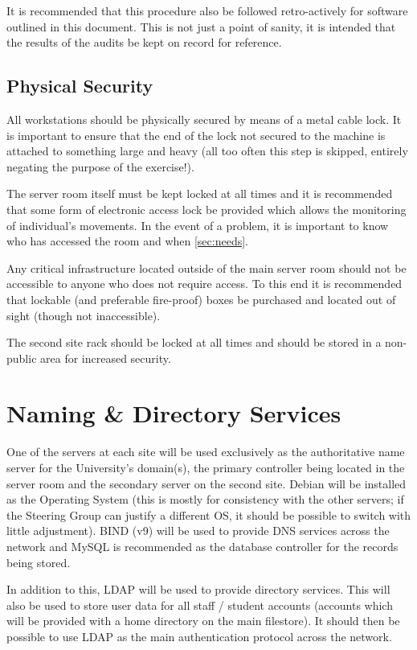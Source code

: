 \documentclass[a4paper, twoside]{article}
\begin{document}
It is recommended that this procedure also be followed retro-actively for
software outlined in this document. This is not just a point of sanity, it is
intended that the results of the audits be kept on record for reference.

\subsection{Physical Security}
All workstations should be physically secured by means of a metal cable lock. It
is important to ensure that the end of the lock not secured to the machine is
attached to something large and heavy (all too often this step is skipped,
entirely negating the purpose of the exercise!).

The server room itself must be kept locked at all times and it is recommended
that some form of electronic access lock be provided which allows the monitoring
of individual's movements. In the event of a problem, it is important to know
who has accessed the room and when \ref{sec:needs}.

Any critical infrastructure located outside of the main server room should not
be accessible to anyone who does not require access. To this end it is
recommended that lockable (and preferable fire-proof) boxes be purchased and
located out of sight (though not inaccessible).

The second site rack should be locked at all times and should be stored in a
non-public area for increased security.

\section{Naming \& Directory Services}
\label{sec:nandd}
One of the servers at each site will be used exclusively as the authoritative name server for
the University's domain(s), the primary controller being located in the server
room and the secondary server on the second site. Debian will be installed as the Operating System
(this is mostly for consistency with the other servers; if the Steering Group
can justify a different OS, it should be possible to switch with little
adjustment). BIND (v9) will be used to provide DNS services across the network
and MySQL is recommended as the database controller for the records being
stored.

In addition to this, LDAP will be used to provide directory services. This will
also be used to store user data for all staff / student accounts (accounts which
will be provided with a home directory on the main filestore). It should then be
possible to use LDAP as the main authentication protocol across the network.
\end{document}

